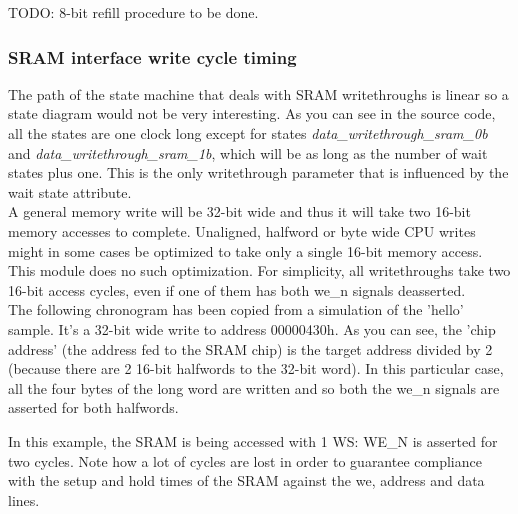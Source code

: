 TODO: 8-bit refill procedure to be done.


\subsubsection{SRAM interface write cycle timing}
\label{sram_write_cycle}

The path of the state machine that deals with SRAM writethroughs is linear so 
a state diagram would not be very interesting. As you can see in the source 
code, all the states are one clock long except for states 
\emph{data\_writethrough\_sram\_0b} and \emph{data\_writethrough\_sram\_1b}, 
which will be as long as the number of wait states plus one.
This is the only writethrough parameter that is influenced by the wait state 
attribute.\\

A general memory write will be 32-bit wide and thus it will take two 16-bit 
memory accesses to complete. Unaligned, halfword or byte wide CPU writes might 
in some cases be optimized to take only a single 16-bit memory access. This 
module does no such optimization.
For simplicity, all writethroughs take two 16-bit access cycles, even if one
of them has both we\_n signals deasserted.\\

The following chronogram has been copied from a simulation of the 'hello' 
sample. It's a 32-bit wide write to address 00000430h.
As you can see, the 'chip address' (the address fed to the SRAM chip) is the 
target address divided by 2 (because there are 2 16-bit halfwords to the 32-bit 
word). In this particular case, all the four bytes of the long word are written 
and so both the we\_n signals are asserted for both halfwords.

In this example, the SRAM is being accessed with 1 WS: WE\_N is asserted for
two cycles. 
Note how a lot of cycles are lost in order to guarantee compliance with the
setup and hold times of the SRAM against the we, address and data lines.

